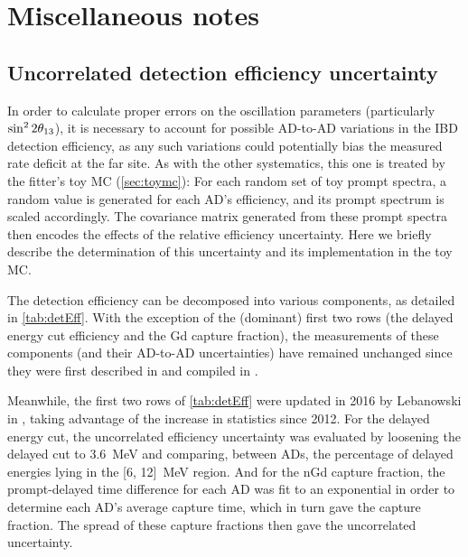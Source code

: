 \documentclass[../thesis.tex]{subfiles}
\begin{document}
\chapter{Miscellaneous notes}
\label{chap:misc}

\section{Uncorrelated detection efficiency uncertainty}
\label{sec:miscDetEff}

In order to calculate proper errors on the oscillation parameters (particularly $\sin^2 2\theta_{13}$), it is necessary to account for possible AD-to-AD variations in the IBD detection efficiency, as any such variations could potentially bias the measured rate deficit at the far site. As with the other systematics, this one is treated by the fitter's toy MC (\autoref{sec:toymc}): For each random set of toy prompt spectra, a random value is generated for each AD's efficiency, and its prompt spectrum is scaled accordingly. The covariance matrix generated from these prompt spectra then encodes the effects of the relative efficiency uncertainty. Here we briefly describe the determination of this uncertainty and its implementation in the toy MC.

The detection efficiency can be decomposed into various components, as detailed in \autoref{tab:detEff}. With the exception of the (dominant) first two rows (the delayed energy cut efficiency and the Gd capture fraction), the measurements of these components (and their AD-to-AD uncertainties) have remained unchanged since they were first described in \cite{SideBySide} and compiled in \cite{PhysRevLett.108.171803}.

Meanwhile, the first two rows of \autoref{tab:detEff} were updated in 2016 by Lebanowski in \cite{loganDetEff}, taking advantage of the increase in statistics since 2012. For the delayed energy cut, the uncorrelated efficiency uncertainty was evaluated by loosening the delayed cut to 3.6~MeV and comparing, between ADs, the percentage of delayed energies lying in the [6, 12]~MeV region. And for the nGd capture fraction, the prompt-delayed time difference for each AD was fit to an exponential in order to determine each AD's average capture time, which in turn gave the capture fraction. The spread of these capture fractions then gave the uncorrelated uncertainty.
\end{document}
